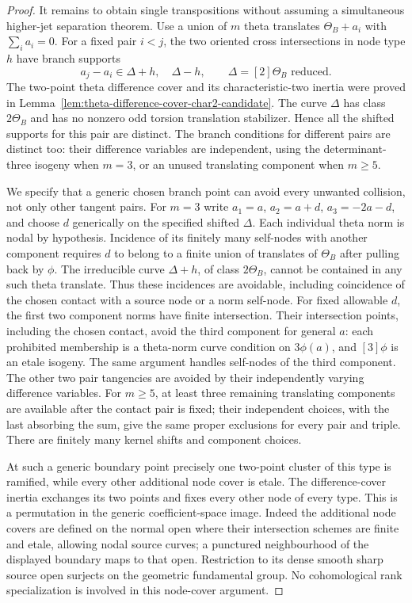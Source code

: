 \begin{proof}
It remains to obtain single transpositions without assuming a
simultaneous higher-jet separation theorem. Use a union of $m$
theta translates $\Theta_B+a_i$ with $\sum_i a_i=0$.
For a fixed pair $i<j$, the two oriented cross intersections in
node type $h$ have branch supports
\[
                 a_j-a_i\in\Delta+h,\quad\Delta-h,
             \qquad\Delta=[2]\Theta_B\text{ reduced}.
\]
The two-point theta difference cover and its characteristic-two
inertia were proved in
Lemma~\ref{lem:theta-difference-cover-char2-candidate}.
The curve $\Delta$ has class $2\Theta_B$ and has no nonzero
odd torsion translation stabilizer. Hence all the shifted
supports for this pair are distinct. The branch conditions for
different pairs are distinct too: their difference variables
are independent, using the determinant-three isogeny when
$m=3$, or an unused translating component when $m\ge5$.

We specify that a generic chosen branch point can avoid every
unwanted collision, not only other tangent pairs. For $m=3$
write $a_1=a$, $a_2=a+d$, $a_3=-2a-d$, and choose $d$ generically
on the specified shifted $\Delta$. Each individual theta norm
is nodal by hypothesis. Incidence of its finitely many self-nodes
with another component requires $d$ to belong to a finite union
of translates of $\Theta_B$ after pulling back by $\phi$.
The irreducible curve $\Delta+h$, of class $2\Theta_B$, cannot
be contained in any such theta translate. Thus these incidences
are avoidable, including coincidence of the chosen contact with
a source node or a norm self-node.
For fixed allowable $d$, the first two component norms have
finite intersection. Their intersection points, including the
chosen contact, avoid the third component for general $a$:
each prohibited membership is a theta-norm curve condition on
$3\phi(a)$, and $[3]\phi$ is an etale isogeny.
The same argument handles self-nodes of the third component.
The other two pair tangencies are avoided by their independently
varying difference variables. For $m\ge5$, at least three
remaining translating components are available after the contact
pair is fixed; their independent choices, with the last absorbing
the sum, give the same proper exclusions for every pair and triple.
There are finitely many kernel shifts and component choices.

At such a generic boundary point precisely one two-point cluster
of this type is ramified, while every other additional node cover
is etale. The difference-cover inertia exchanges its two points
and fixes every other node of every type. This is a permutation
in the generic coefficient-space image. Indeed the additional
node covers are defined on the normal open where their intersection
schemes are finite and etale, allowing nodal source curves; a
punctured neighbourhood of the displayed boundary maps to that
open. Restriction to its dense smooth sharp source open surjects
on the geometric fundamental group. No cohomological rank
specialization is involved in this node-cover argument.


\end{proof}
